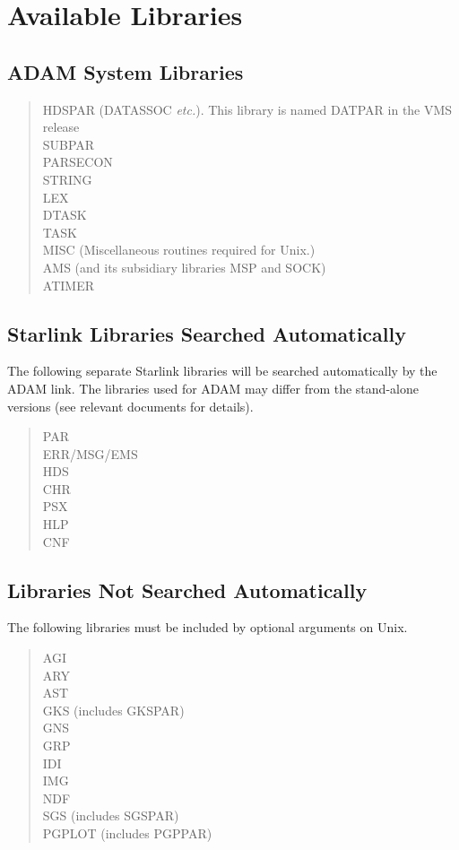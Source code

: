 \documentclass[twoside,11pt]{article}
\newcommand{\xlabel}[1]{}
\renewcommand{\_}{\texttt{\symbol{95}}}
\begin{document}
\section{\xlabel{available_libraries}\label{libs}Available Libraries}
\subsection*{ADAM System Libraries}
\begin{verse}
HDSPAR (DAT\_ASSOC \textit{etc.}). This library is named DATPAR in the VMS
release \\
SUBPAR \\
PARSECON \\
STRING \\
LEX \\
DTASK \\
TASK \\
MISC (Miscellaneous routines required for Unix.) \\
AMS (and its subsidiary libraries MSP and SOCK) \\
ATIMER
\end{verse}

\subsection*{Starlink Libraries Searched Automatically}
The following separate Starlink libraries will be searched automatically by
the ADAM link. The libraries used for ADAM may differ from the stand-alone
versions (see relevant documents for details).

\begin{verse}
PAR \\
ERR/MSG/EMS \\
HDS \\
CHR \\
PSX \\
HLP \\
CNF
\end{verse}

\subsection*{Libraries Not Searched Automatically}
The following libraries must be included by optional arguments on Unix.

\begin{verse}
AGI \\
ARY \\
AST \\
GKS (includes GKSPAR) \\
GNS \\
GRP \\
IDI \\
IMG \\
NDF \\
SGS (includes SGSPAR) \\
PGPLOT (includes PGPPAR) \\
\end{verse}
\end{document}
